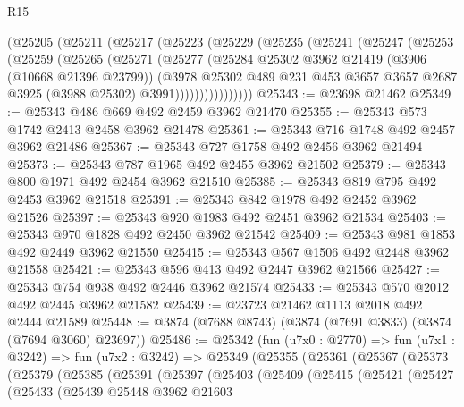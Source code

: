 \begin{lexlean}{R15}
\begin{coremodule}
      (@25205
        (@25211
          (@25217
            (@25223
              (@25229
                (@25235
                  (@25241
                    (@25247
                      (@25253
                        (@25259
                          (@25265
                            (@25271
                              (@25277
                                (@25284
                                  @25302
                                  @3962
                                  @21419
                                  (@3906 (@10668 @21396 @23799))
                                  (@3978
                                    @25302
                                    @489
                                    @231
                                    @453
                                    @3657
                                    @3657
                                    @2687
                                    @3925
                                    (@3988 @25302)
                                    @3991))))))))))))))))
@25343 := @23698 @21462
@25349 := @25343 @486 @669 @492 @2459 @3962 @21470
@25355 := @25343 @573 @1742 @2413 @2458 @3962 @21478
@25361 := @25343 @716 @1748 @492 @2457 @3962 @21486
@25367 := @25343 @727 @1758 @492 @2456 @3962 @21494
@25373 := @25343 @787 @1965 @492 @2455 @3962 @21502
@25379 := @25343 @800 @1971 @492 @2454 @3962 @21510
@25385 := @25343 @819 @795 @492 @2453 @3962 @21518
@25391 := @25343 @842 @1978 @492 @2452 @3962 @21526
@25397 := @25343 @920 @1983 @492 @2451 @3962 @21534
@25403 := @25343 @970 @1828 @492 @2450 @3962 @21542
@25409 := @25343 @981 @1853 @492 @2449 @3962 @21550
@25415 := @25343 @567 @1506 @492 @2448 @3962 @21558
@25421 := @25343 @596 @413 @492 @2447 @3962 @21566
@25427 := @25343 @754 @938 @492 @2446 @3962 @21574
@25433 := @25343 @570 @2012 @492 @2445 @3962 @21582
@25439 := @23723 @21462 @1113 @2018 @492 @2444 @21589
@25448 := @3874 (@7688 @8743) (@3874 (@7691 @3833) (@3874 (@7694 @3060) @23697))
@25486 := @25342
    (fun (u7x0 : @2770) =>
    fun (u7x1 : @3242) =>
    fun (u7x2 : @3242) =>
    @25349
      (@25355
        (@25361
          (@25367
            (@25373
              (@25379
                (@25385
                  (@25391
                    (@25397
                      (@25403
                        (@25409
                          (@25415
                            (@25421
                              (@25427
                                (@25433
                                  (@25439
                                    @25448
                                    @3962
                                    @21603

\end{coremodule}
\end{lexlean}
